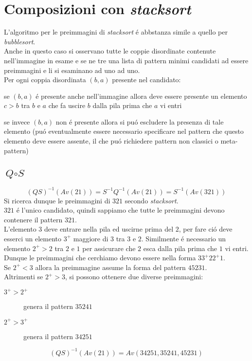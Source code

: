 \section*{Composizioni con \textit{stacksort}}
L'algoritmo per le preimmagini di \textit{stacksort} \'e abbstanza simile a quello per \textit{bubblesort}.\\
Anche in questo caso si osservano tutte le coppie disordinate contenute nell'immagine in esame e se ne tre una lista di pattern minimi candidati ad essere preimmagini e li si esaminano ad uno ad uno.\\
Per ogni coppia disordinata $(b,a)$ presente nel candidato: 
\begin{description}
\item se $(b,a)$ \'e presente anche nell'immagine allora deve essere presente un elemento $c>b$ tra $b$ e $a$ che fa uscire $b$ dalla pila prima che $a$ vi entri
\item se invece $(b,a)$ non \'e presente allora si pu\'o escludere la presenza di tale elemento (pu\'o eventualmente essere necessario specificare nel pattern che questo elemento deve essere assente, il che pu\'o richiedere pattern non classici o meta-pattern\cite{claesson2012sorting})
\end{description}
\subsection*{$\textit{Q}\circ\textit{S}$}$$(QS)^{-1}(Av(21))=S^{-1}Q^{-1}(Av(21))=S^{-1}(Av(321))$$
Si ricerca dunque le preimmagini di $321$ secondo \textit{stacksort}.\\$321$ \'e l'unico candidato, quindi sappiamo che tutte le preimmagini devono contenere il pattern $321$.\\
L'elemento $3$ deve entrare nella pila ed uscirne prima del $2$, per fare ci\'o deve esserci un elemento $3^+$ maggiore di $3$ tra $3$ e $2$. Similmente \'e necessario un elemento $2^+>2$ tra $2$ e $1$ per assicurare che $2$ esca dalla pila prima che $1$ vi entri.\\
Dunque le preimmagini che cerchiamo devono essere nella forma $33^+22^+1$.\\
Se $2^+<3$ allora la preimmagine assume la forma del pattern $45231$.\\
Altrimenti se $2^+>3$, si possono ottenere due diverse preimmagini:
\begin{description}
	\item[$3^+>2^+$] genera il pattern $35241$
	\item[$2^+>3^+$] genera il pattern $34251$
\end{description}
$$(QS)^{-1}(Av(21)) = Av(34251, 35241, 45231)$$
